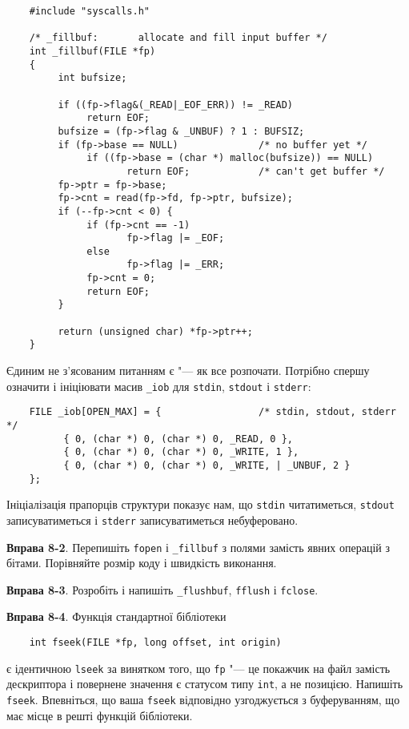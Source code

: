 \documentclass[a4paper,12pt]{book}
\begin{document}
  \begin{verbatim}
    #include "syscalls.h"

    /* _fillbuf:       allocate and fill input buffer */
    int _fillbuf(FILE *fp)
    {
         int bufsize;

         if ((fp->flag&(_READ|_EOF_ERR)) != _READ)
              return EOF;
         bufsize = (fp->flag & _UNBUF) ? 1 : BUFSIZ;
         if (fp->base == NULL)              /* no buffer yet */
              if ((fp->base = (char *) malloc(bufsize)) == NULL)
                     return EOF;            /* can't get buffer */
         fp->ptr = fp->base;
         fp->cnt = read(fp->fd, fp->ptr, bufsize);
         if (--fp->cnt < 0) {
              if (fp->cnt == -1)
                     fp->flag |= _EOF;
              else
                     fp->flag |= _ERR;
              fp->cnt = 0;
              return EOF;
         }

         return (unsigned char) *fp->ptr++;
    }
  \end{verbatim}

  Єдиним не з'ясованим питанням є "--- як все розпочати. Потрібно спершу означити і
  ініціювати масив \texttt{\_iob} для \texttt{stdin}, \texttt{stdout} і \texttt{stderr}:
  \begin{verbatim}
    FILE _iob[OPEN_MAX] = {                 /* stdin, stdout, stderr */
          { 0, (char *) 0, (char *) 0, _READ, 0 },
          { 0, (char *) 0, (char *) 0, _WRITE, 1 },
          { 0, (char *) 0, (char *) 0, _WRITE, | _UNBUF, 2 }
    };
  \end{verbatim}

  Ініціалізація прапорців структури показує нам, що \texttt{stdin} читатиметься,
  \texttt{stdout} записуватиметься і \texttt{stderr} записуватиметься небуферовано.

  \textbf{Вправа 8-2}. Перепишіть \texttt{fopen} і \texttt{\_fillbuf} з полями замість явних
  операцій з бітами. Порівняйте розмір коду і швидкість виконання.

  \textbf{Вправа 8-3}. Розробіть і напишіть \texttt{\_flushbuf}, \texttt{fflush} і
  \texttt{fclose}.

  \textbf{Вправа 8-4}. Функція стандартної бібліотеки
  \begin{verbatim}
    int fseek(FILE *fp, long offset, int origin)
  \end{verbatim}
  є ідентичною \texttt{lseek} за винятком того, що \texttt{fp} "--- це покажчик на
  файл замість дескриптора і повернене значення є статусом типу \texttt{int}, а не
  позицією. Напишіть \texttt{fseek}. Впевніться, що ваша \texttt{fseek} відповідно
  узгоджується з буферуванням, що має місце в решті функцій бібліотеки.
\end{document}
